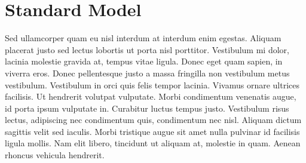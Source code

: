 \chapter{Standard Model}
\label{chap:sm}

Sed ullamcorper quam eu nisl interdum at interdum enim egestas. Aliquam
placerat justo sed lectus lobortis ut porta nisl porttitor. Vestibulum mi
dolor, lacinia molestie gravida at, tempus vitae ligula. Donec eget quam
sapien, in viverra eros. Donec pellentesque justo a massa fringilla non
vestibulum metus vestibulum. Vestibulum in orci quis felis tempor lacinia.
Vivamus ornare ultrices facilisis. Ut hendrerit volutpat vulputate. Morbi
condimentum venenatis augue, id porta ipsum vulputate in. Curabitur luctus
tempus justo. Vestibulum risus lectus, adipiscing nec condimentum quis,
condimentum nec nisl. Aliquam dictum sagittis velit sed iaculis. Morbi
tristique augue sit amet nulla pulvinar id facilisis ligula mollis. Nam elit
libero, tincidunt ut aliquam at, molestie in quam. Aenean rhoncus vehicula
hendrerit.
